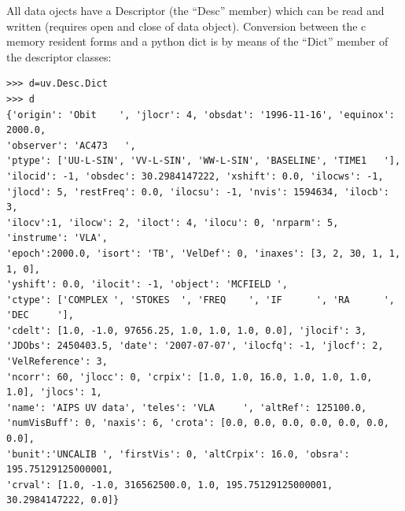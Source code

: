 \documentclass[11pt]{report}
\begin{document}
All data ojects have a Descriptor (the ``Desc'' member) which can be
read and written (requires open and close of data object).
Conversion between the c memory resident forms and a python dict is by
means of the ``Dict'' member of the descriptor classes:
\begin{verbatim}
>>> d=uv.Desc.Dict
>>> d
{'origin': 'Obit    ', 'jlocr': 4, 'obsdat': '1996-11-16', 'equinox':  2000.0, 
'observer': 'AC473   ', 
'ptype': ['UU-L-SIN', 'VV-L-SIN', 'WW-L-SIN', 'BASELINE', 'TIME1   '], 
'ilocid': -1, 'obsdec': 30.2984147222, 'xshift': 0.0, 'ilocws': -1,
'jlocd': 5, 'restFreq': 0.0, 'ilocsu': -1, 'nvis': 1594634, 'ilocb': 3, 
'ilocv':1, 'ilocw': 2, 'iloct': 4, 'ilocu': 0, 'nrparm': 5, 'instrume': 'VLA', 
'epoch':2000.0, 'isort': 'TB', 'VelDef': 0, 'inaxes': [3, 2, 30, 1, 1, 1, 0],
'yshift': 0.0, 'ilocit': -1, 'object': 'MCFIELD ', 
'ctype': ['COMPLEX ', 'STOKES  ', 'FREQ    ', 'IF      ', 'RA      ',  'DEC     '], 
'cdelt': [1.0, -1.0, 97656.25, 1.0, 1.0, 1.0, 0.0], 'jlocif': 3,
'JDObs': 2450403.5, 'date': '2007-07-07', 'ilocfq': -1, 'jlocf': 2, 'VelReference': 3,
'ncorr': 60, 'jlocc': 0, 'crpix': [1.0, 1.0, 16.0, 1.0, 1.0, 1.0, 1.0], 'jlocs': 1,
'name': 'AIPS UV data', 'teles': 'VLA     ', 'altRef': 125100.0,
'numVisBuff': 0, 'naxis': 6, 'crota': [0.0, 0.0, 0.0, 0.0, 0.0, 0.0, 0.0], 
'bunit':'UNCALIB ', 'firstVis': 0, 'altCrpix': 16.0, 'obsra': 195.75129125000001, 
'crval': [1.0, -1.0, 316562500.0, 1.0, 195.75129125000001, 30.2984147222, 0.0]}
\end{verbatim}
\end{document}
